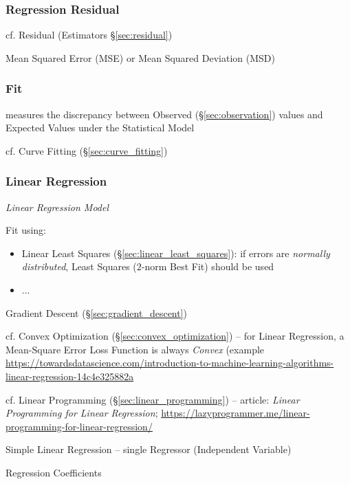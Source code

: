 \subsubsection{Regression Residual}\label{sec:regression_residual}

\fist cf. Residual (Estimators \S\ref{sec:residual})

Mean Squared Error (MSE) or Mean Squared Deviation (MSD)



\subsubsection{Fit}\label{sec:model_fit}

measures the discrepancy between Observed (\S\ref{sec:observation}) values and
Expected Values under the Statistical Model


cf. Curve Fitting (\S\ref{sec:curve_fitting})



\subsubsection{Linear Regression}\label{sec:linear_regression}

\emph{Linear Regression Model}

Fit using:
\begin{itemize}
  \item Linear Least Squares (\S\ref{sec:linear_least_squares}): if errors are
    \emph{normally distributed}, Least Squares ($2$-norm Best Fit) should be
    used
  \item ...
\end{itemize}

Gradient Descent (\S\ref{sec:gradient_descent})

cf. Convex Optimization (\S\ref{sec:convex_optimization}) -- for Linear
Regression, a Mean-Square Error Loss Function is always \emph{Convex} (example
\url{https://towardsdatascience.com/introduction-to-machine-learning-algorithms-linear-regression-14c4e325882a}

cf. Linear Programming (\S\ref{sec:linear_programming})
-- article: \emph{Linear Programming for Linear Regression};
\url{https://lazyprogrammer.me/linear-programming-for-linear-regression/}

Simple Linear Regression -- single Regressor (Independent Variable)

Regression Coefficients

